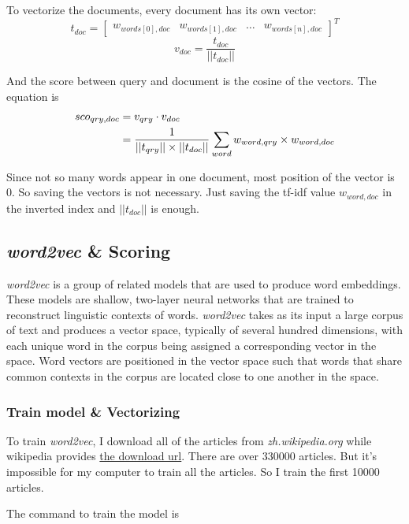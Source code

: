 \documentclass[a4paper]{article}
\begin{document}
To vectorize the documents, every document has its own vector:$$t_{doc}=\left[\begin{matrix}w_{words[0],doc}&w_{words[1],doc}&\ldots&w_{words[n],doc}\end{matrix}\right]^{T}$$$$v_{doc}=\frac{t_{doc}}{||t_{doc}||}$$

And the score between query and document is the cosine of the vectors. The equation is
\begin{equation}
\begin{aligned}
sco_{qry,doc} & =v_{qry}\cdot v_{doc} \\
& =\frac{1}{||t_{qry}||\times||t_{doc}||}\sum_{word}w_{word,qry}\times w_{word,doc} \notag
\end{aligned}
\end{equation}

Since not so many words appear in one document, most position of the vector is 0. So saving the vectors is not necessary. Just saving the tf-idf value $w_{word,doc}$ in the inverted index and $||t_{doc}||$ is enough.

\subsection{\emph{word2vec} \& Scoring}

\emph{word2vec} is a group of related models that are used to produce word embeddings. These models are shallow, two-layer neural networks that are trained to reconstruct linguistic contexts of words. \emph{word2vec} takes as its input a large corpus of text and produces a vector space, typically of several hundred dimensions, with each unique word in the corpus being assigned a corresponding vector in the space. Word vectors are positioned in the vector space such that words that share common contexts in the corpus are located close to one another in the space.

\subsubsection{Train model \& Vectorizing}

To train \emph{word2vec}, I download all of the articles from \emph{zh.wikipedia.org} while wikipedia provides \href{https://dumps.wikimedia.org/zhwiki/latest/zhwiki-latest-pages-articles.xml.bz2}{the download url}. There are over 330000 articles. But it's impossible for my computer to train all the articles. So I train the first 10000 articles.

The command to train the model is 
\end{document}
